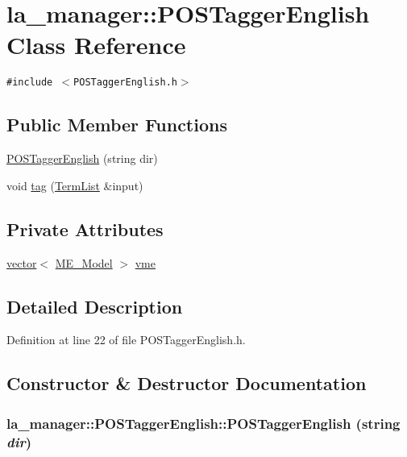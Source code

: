 \hypertarget{classla__manager_1_1POSTaggerEnglish}{
\section{la\_\-manager::POSTaggerEnglish Class Reference}
\label{classla__manager_1_1POSTaggerEnglish}
}
{\tt \#include $<$POSTaggerEnglish.h$>$}

\subsection*{Public Member Functions}
\begin{CompactItemize}
\item 
\hyperlink{classla__manager_1_1POSTaggerEnglish_0197896e5e94a99ebcf5ae85f22fd2e5}{POSTaggerEnglish} (string dir)
\item 
void \hyperlink{classla__manager_1_1POSTaggerEnglish_3f859b50241f70613b46747cc3736c8c}{tag} (\hyperlink{namespacela__manager_06c0aab93982ee3ebc3ef9d0419e619a}{TermList} \&input)
\end{CompactItemize}
\subsection*{Private Attributes}
\begin{CompactItemize}
\item 
\hyperlink{classstd_1_1vector}{vector}$<$ \hyperlink{classME__Model}{ME\_\-Model} $>$ \hyperlink{classla__manager_1_1POSTaggerEnglish_08915bdebf896a890961c98d9a627cd2}{vme}
\end{CompactItemize}


\subsection{Detailed Description}


Definition at line 22 of file POSTaggerEnglish.h.

\subsection{Constructor \& Destructor Documentation}
\hypertarget{classla__manager_1_1POSTaggerEnglish_0197896e5e94a99ebcf5ae85f22fd2e5}{
\subsubsection[{POSTaggerEnglish}]{\setlength{\rightskip}{0pt plus 5cm}la\_\-manager::POSTaggerEnglish::POSTaggerEnglish (string {\em dir})}}
\label{classla__manager_1_1POSTaggerEnglish_0197896e5e94a99ebcf5ae85f22fd2e5}





